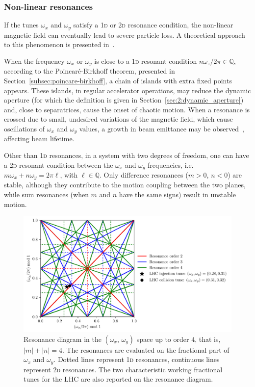 \subsubsection{Non-linear resonances}

If the tunes $\omega_x$ and $\omega_y$ satisfy a 1\textsc{d} or 2\textsc{d} resonance condition, the non-linear magnetic field can eventually lead to severe particle loss. A theoretical approach to this phenomenon is presented in~\cite{Bazzani:262179, wilson}.

When the frequency $\omega_x$ or $\omega_y$ is close to a 1\textsc{d} resonant condition $n\omega_z / 2\pi \in \mathbb{Q}$, according to the Poincaré-Birkhoff theorem, presented in Section~\ref{subsec:poincare-birkhoff}, a chain of islands with extra fixed points appears. These islands, in regular accelerator operations, may reduce the dynamic aperture (for which the definition is given in Section~\ref{sec:2:dynamic_aperture}) and, close to separatrices, cause the onset of chaotic motion. When a resonance is crossed due to small, undesired variations of the magnetic field, which cause oscillations of $\omega_x$ and $\omega_y$ values, a growth in beam emittance may be observed~\cite{Guignard:185921}, affecting beam lifetime.

Other than 1\textsc{d} resonances, in a system with two degrees of freedom, one can have a 2\textsc{d} resonant condition between the $\omega_x$ and $\omega_y$ frequencies, i.e.\ $m\omega_x+n\omega_y = 2\pi\ell$, with $\ell \in \mathbb{Q}$. Only difference resonances ($m>0$, $n<0$) are stable, although they contribute to the motion coupling between the two planes, while sum resonances (when $m$ and $n$ have the same signs) result in unstable motion.

\begin{figure}
	\centering
	\includegraphics[width=.85\textwidth]{2_accelerator_physics_fundamentals/figs/tune_space.pdf}
	\caption{Resonance diagram in the $(\omega_x,\,\omega_y)$ space up to order $4$, that is, $|m|+|n| = 4$. The resonances are evaluated on the fractional part of $\omega_x$ and $\omega_y$. Dotted lines represent 1\textsc{d} resonances, continuous lines represent 2\textsc{d} resonances. The two characteristic working fractional tunes for the LHC are also reported on the resonance diagram.}
	\label{fig:res}
\end{figure}

